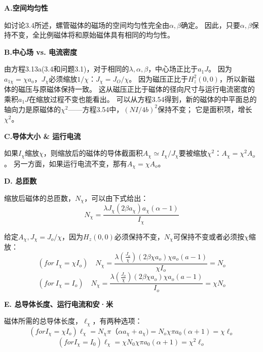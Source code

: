 \textbf{A.空间均匀性}

如讨论3.4所述，螺管磁体的磁场的空间均匀性完全由$\alpha,\beta$确定。
因此，只要$\alpha,\beta$保持不变，全比例磁体将和原始磁体具有相同的均匀性。

\textbf{B.中心场 vs. 电流密度}

由方程3.13a(3.4和问题3.1)，对于相同的$\lambda,\alpha,\beta$，中心场正比于$a_1 J$。
因为$a_{1\chi}=\chi a_o$，$J_\chi$必须缩放$1/\chi$：$J_\chi=J_O/\chi$。
因为磁压正比于$H_z^2(0, 0)$，所以新磁体的磁压与原磁体保持一致。
这从磁压正比于磁体的径向尺寸与运行电流密度的乘积$a_1 J$在缩放过程不变也能看出。
可以从方程3.54得到，新的磁体的中平面总的轴向力是原磁体的$\chi^2$——方程3.54中，$(NI/4b)^2$保持不变；
它是面积项，增长$\chi^2$。

\textbf{C.导体大小 \& 运行电流}

如果$I_\chi$缩放$\chi$，则缩放后的磁体的导体截面积$A_\chi\simeq I_\chi/J_\chi$要被缩放$\chi^2$：$A_\chi=\chi^2 A_o$。
另一方面，如果运行电流不变，那有$A_\chi=\chi A_o$。

\textbf{D. 总匝数}

缩放后磁体的总匝数，$N_\chi$，可以由下式给出：
\begin{equation}
N_{\chi}=\frac{\lambda J_{\chi}(2\beta a_{\chi})a_{\chi}(\alpha-1)}{I_{\chi}}%
\end{equation}

给定$A_\chi,J_\chi =J_o/\chi$，因为$H_z(0,0)$必须保持不变，$N_\chi$可保持不变或者必须按$\chi$缩放：
\begin{equation}
(for\ I_{\chi}=\chi I_{o})\quad N_{\chi}=\frac{\lambda(\frac{J_{o}}{\chi})(2\beta\chi a_{o})\chi a_{o}(a-1)}{\chi I_{o}}=N_{o}%
\end{equation}
\begin{equation}
(for\ I_{\chi}=I_{o})\quad  N_{\chi}=\frac{\lambda(\frac{J_{o}}{\chi})(2\beta\chi a_{o})\chi a_{o}(a-1)}{I_{o}}=\chi N_{o}%
\end{equation}

\textbf{E. 总导体长度、运行电流和安·米}

磁体所需的总导体长度，$\ell_\chi$，有两种选项：
\begin{equation}
(for I_{\chi}=\chi I_{o}) \ell_{\chi}=N_{\chi} \pi （\alpha a_\chi+a_\chi)=N_{o}\chi \pi a_0(\alpha+1)=\chi \ell_{o}%
\end{equation}
\begin{equation}
(for I_{\chi}=I_0) \ell_{\chi}=\chi N_0 \chi \pi a_0 (\alpha+1)=\chi^2 \ell_{o}%
\end{equation}

